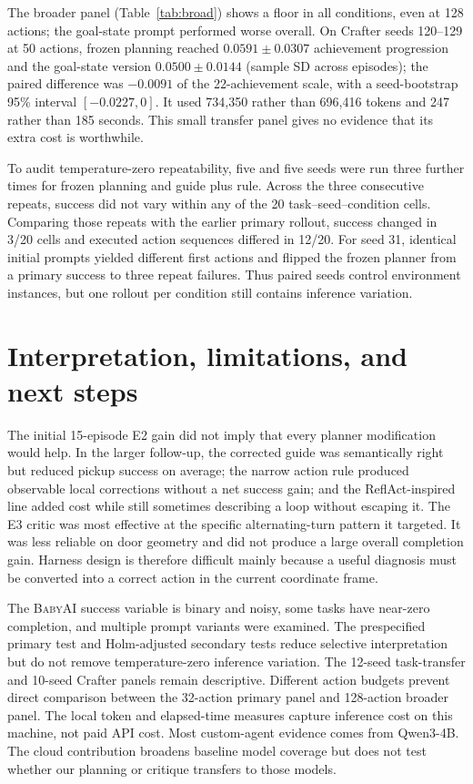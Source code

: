 \documentclass[11pt,a4paper]{article}
\newcommand{\BabyAI}{\textsc{BabyAI}}
\begin{document}
The broader panel (Table~\ref{tab:broad}) shows a  floor in all conditions, even at 128 actions; the goal-state prompt performed worse overall. On Crafter seeds 120--129 at 50 actions, frozen planning reached $0.0591\pm0.0307$ achievement progression and the goal-state version $0.0500\pm0.0144$ (sample SD across episodes); the paired difference was $-0.0091$ of the 22-achievement scale, with a seed-bootstrap 95\% interval $[-0.0227,0]$. It used 734,350 rather than 696,416 tokens and 247 rather than 185 seconds. This small transfer panel gives no evidence that its extra cost is worthwhile.

To audit temperature-zero repeatability, five  and five  seeds were run three further times for frozen planning and guide plus rule. Across the three consecutive repeats, success did not vary within any of the 20 task--seed--condition cells. Comparing those repeats with the earlier primary rollout, success changed in 3/20 cells and executed action sequences differed in 12/20. For  seed 31, identical initial prompts yielded different first actions and flipped the frozen planner from a primary success to three repeat failures. Thus paired seeds control environment instances, but one rollout per condition still contains inference variation.

\section{Interpretation, limitations, and next steps}

The initial 15-episode E2 gain did not imply that every planner modification would help. In the larger follow-up, the corrected guide was semantically right but reduced pickup success on average; the narrow action rule produced observable local corrections without a net success gain; and the ReflAct-inspired line added cost while still sometimes describing a loop without escaping it. The E3 critic was most effective at the specific alternating-turn pattern it targeted. It was less reliable on door geometry and did not produce a large overall completion gain. Harness design is therefore difficult mainly because a useful diagnosis must be converted into a correct action in the current coordinate frame.

The \BabyAI{} success variable is binary and noisy, some tasks have near-zero completion, and multiple prompt variants were examined. The prespecified primary test and Holm-adjusted secondary tests reduce selective interpretation but do not remove temperature-zero inference variation. The 12-seed task-transfer and 10-seed Crafter panels remain descriptive. Different action budgets prevent direct comparison between the 32-action primary panel and 128-action broader panel. The local token and elapsed-time measures capture inference cost on this machine, not paid API cost. Most custom-agent evidence comes from Qwen3-4B. The cloud contribution broadens baseline model coverage but does not test whether our planning or critique transfers to those models.
\end{document}
